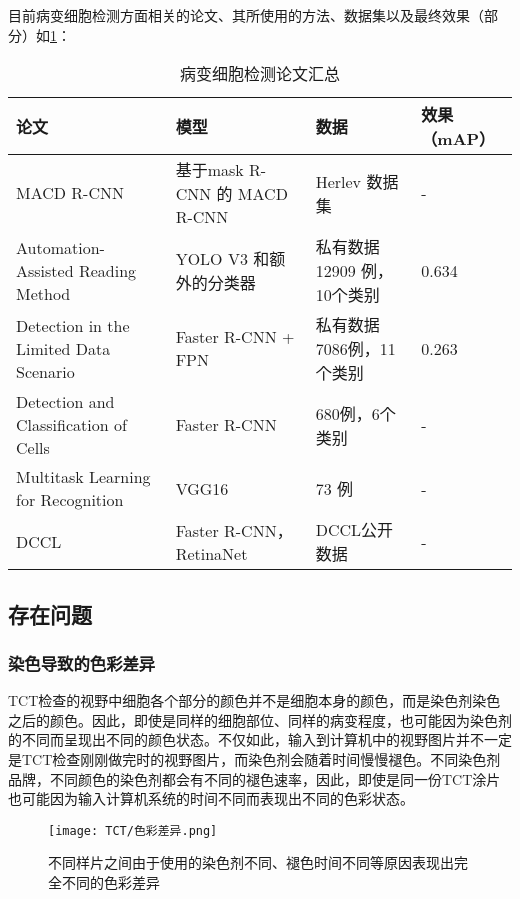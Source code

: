\par 目前病变细胞检测方面相关的论文、其所使用的方法、数据集以及最终效果（部分）如\ref{检测论文}：
\begin{table}[htbp]
    \center
    \tiny
    \caption{病变细胞检测论文汇总}
    \begin{tabular}{p{120pt}p{100pt}p{85pt}p{35pt}}
        \hline
        论文                                                             & 模型                         & 数据                       & 效果（mAP） \\
        \hline
        MACD R-CNN\cite{ma2020macd}                                      & 基于mask R-CNN 的 MACD R-CNN & Herlev 数据集              & -           \\
        Automation-Assisted Reading Method\cite{xiang2020novel}          & YOLO V3 和额外的分类器       & 私有数据12909 例，10个类别 & 0.634       \\
        Detection in the Limited Data Scenario\cite{liang2018comparison} & Faster R-CNN + FPN           & 私有数据7086例，11个类别   & 0.263       \\
        Detection and Classification of Cells\cite{li2019detection}      & Faster R-CNN                 & 680例，6个类别             & -           \\
        Multitask Learning for Recognition\cite{liu2018multitask}        & VGG16                        & 73 例                      & -           \\
        DCCL\cite{zhang2019dccl}                                         & Faster R-CNN，RetinaNet      & DCCL公开数据               & -           \\
        \hline
    \end{tabular}
    \label{检测论文}
\end{table}

\subsection{存在问题}
\subsubsection{染色导致的色彩差异}
\par TCT检查的视野中细胞各个部分的颜色并不是细胞本身的颜色，而是染色剂染色之后的颜色。因此，即使是同样的细胞部位、同样的病变程度，也可能因为染色剂的不同而呈现出不同的颜色状态。不仅如此，输入到计算机中的视野图片并不一定是TCT检查刚刚做完时的视野图片，而染色剂会随着时间慢慢褪色。不同染色剂品牌，不同颜色的染色剂都会有不同的褪色速率，因此，即使是同一份TCT涂片也可能因为输入计算机系统的时间不同而表现出不同的色彩状态。
\begin{figure}[h]
    \centering
    \texttt{[image: TCT/色彩差异.png]}
    \caption{不同样片之间由于使用的染色剂不同、褪色时间不同等原因表现出完全不同的色彩差异}
    \label{色彩差异}
\end{figure}
